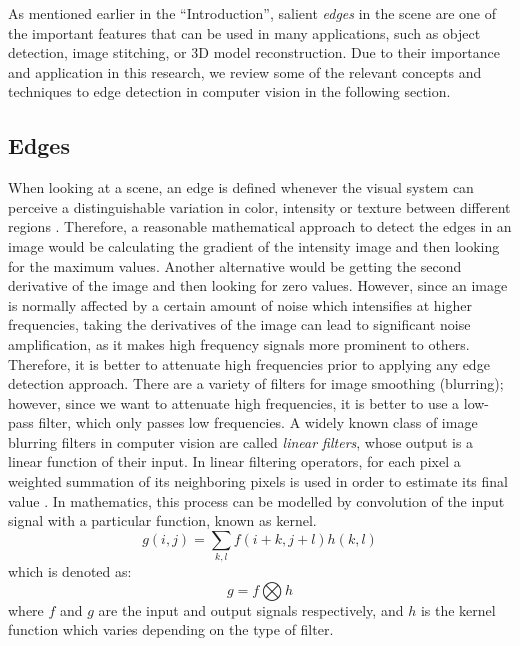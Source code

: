 As mentioned earlier in the ``Introduction'', salient {\it edges} in the scene are one of the important features 
that can be used in many applications, such as object detection, image stitching, or 3D model reconstruction.
Due to their importance and application in this research, we review some of the relevant concepts and techniques to edge detection
in computer vision in the following section.

\subsection{Edges}
When looking at a scene, an edge is defined whenever the visual system can perceive a distinguishable variation in color, intensity or texture between 
different regions \cite{sze11}.
Therefore, a reasonable mathematical approach to detect the edges in an image would be calculating the gradient of the intensity image and then looking for the maximum
values. Another alternative would be getting the second derivative of the image and then looking for zero values. However, since an image is normally affected by a 
certain amount of noise which intensifies at higher frequencies, taking the derivatives of the image can lead to significant noise amplification, 
as it makes high frequency signals more prominent to others.
Therefore, it is better to attenuate high frequencies prior to applying any edge detection approach. 
There are a variety of filters for image smoothing (blurring); however, since we want to attenuate high frequencies, it is better to use a low-pass filter,
which only passes low frequencies.
A widely known class of image blurring filters in computer vision are called {\it linear filters}, whose output is a linear function of their input. 
In linear filtering operators, for each pixel a weighted summation of its neighboring pixels
is used in order to estimate its final value \cite{sze11}. In mathematics, this process can be modelled by convolution of the input signal with a particular function, known as kernel. 
\begin{equation}
g(i,j)=\sum_{k,l}f(i+k,j+l)h(k,l)
\end{equation}
which is denoted as:
\begin{equation}
g=f\bigotimes h
\end{equation}
where $f$ and $g$ are the input and output signals respectively, and $h$ is the kernel function which varies depending on the type of filter. 


